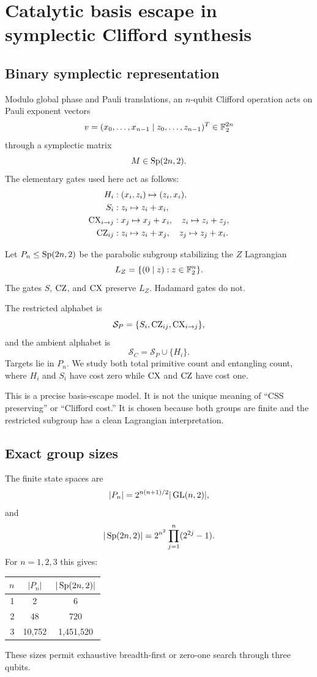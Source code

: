 \chapter{Catalytic basis escape in symplectic Clifford synthesis}\label{ch:clifford}


\section{Binary symplectic representation}
Modulo global phase and Pauli translations, an $n$-qubit Clifford operation acts on Pauli exponent vectors
\[
v=(x_0,\ldots,x_{n-1}\mid z_0,\ldots,z_{n-1})^T\in\mathbb F_2^{2n}
\]
through a symplectic matrix
\[
M\in\operatorname{Sp}(2n,2).
\]
The elementary gates used here act as follows:
\begin{align*}
H_i &: (x_i,z_i)\mapsto(z_i,x_i),\\
S_i &: z_i\mapsto z_i+x_i,\\
\operatorname{CX}_{i\to j} &: x_j\mapsto x_j+x_i,
\quad z_i\mapsto z_i+z_j,\\
\operatorname{CZ}_{ij} &: z_i\mapsto z_i+x_j,
\quad z_j\mapsto z_j+x_i.
\end{align*}

Let $P_n\le\operatorname{Sp}(2n,2)$ be the parabolic subgroup stabilizing the $Z$ Lagrangian
\[
L_Z=\{(0\mid z):z\in\mathbb F_2^n\}.
\]
The gates $S$, $\operatorname{CZ}$, and $\operatorname{CX}$ preserve $L_Z$.  Hadamard gates do not.

\begin{definition}
The restricted alphabet is
\[
\mathcal S_P
=
\{S_i,\operatorname{CZ}_{ij},\operatorname{CX}_{i\to j}\},
\]
and the ambient alphabet is
\[
\mathcal S_C
=
\mathcal S_P\cup\{H_i\}.
\]
Targets lie in $P_n$.  We study both total primitive count and entangling count, where $H_i$ and $S_i$ have cost zero while $\operatorname{CX}$ and $\operatorname{CZ}$ have cost one.
\end{definition}

This is a precise basis-escape model.  It is not the unique meaning of ``CSS preserving'' or ``Clifford cost.''  It is chosen because both groups are finite and the restricted subgroup has a clean Lagrangian interpretation.

\section{Exact group sizes}
The finite state spaces are
\[
|P_n|
=
2^{n(n+1)/2}|\operatorname{GL}(n,2)|,
\]
and
\[
|\operatorname{Sp}(2n,2)|
=
2^{n^2}\prod_{j=1}^n(2^{2j}-1).
\]
For $n=1,2,3$ this gives:
\begin{center}
\begin{tabular}{@{}rcc@{}}
\toprule
$n$&$|P_n|$&$|\operatorname{Sp}(2n,2)|$\\
\midrule
1&2&6\\
2&48&720\\
3&10,752&1,451,520\\
\bottomrule
\end{tabular}
\end{center}
These sizes permit exhaustive breadth-first or zero-one search through three qubits.

